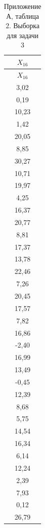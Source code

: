 \scriptsize
\setlength{\tabcolsep}{3pt}
\begin{longtable}{c}
\caption{Приложение А, таблица 2. Выборка для задачи 3}\\
\toprule
$X_{16}$ \\
\midrule
\endfirsthead
\toprule
$X_{16}$ \\
\midrule
\endhead
3,02 \\
0,19 \\
10,23 \\
1,42 \\
20,05 \\
8,85 \\
30,27 \\
10,71 \\
19,97 \\
4,25 \\
16,37 \\
20,77 \\
8,81 \\
17,37 \\
13,78 \\
22,46 \\
7,26 \\
20,45 \\
17,57 \\
7,82 \\
16,86 \\
-2,40 \\
16,99 \\
13,49 \\
-0,45 \\
12,39 \\
8,68 \\
5,75 \\
14,54 \\
16,34 \\
6,14 \\
12,24 \\
2,39 \\
7,93 \\
0,12 \\
26,79 \\
\bottomrule
\end{longtable}
